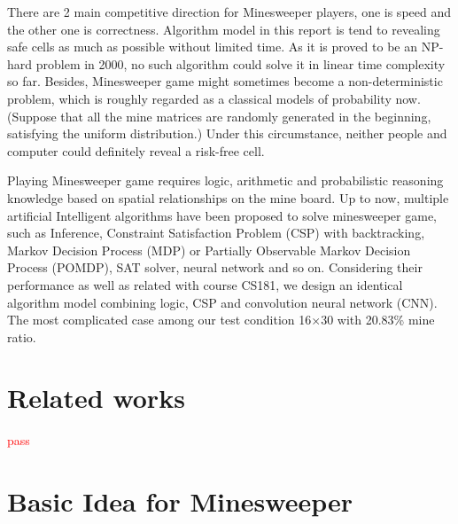 \documentclass[10pt,twocolumn,letterpaper]{article}
\begin{document}
There are 2 main competitive direction for Minesweeper players, one is speed and the other one is correctness. Algorithm model in this report is tend to revealing safe cells as much as possible without limited time. As it is proved to be an NP-hard problem in 2000, no such algorithm could solve it in linear time complexity so far. Besides, Minesweeper game might sometimes become a non-deterministic problem, which is roughly regarded as a classical models of probability now.(Suppose that all the mine matrices are randomly  generated in the beginning, satisfying the uniform distribution.) Under this circumstance, neither people and computer could definitely reveal a risk-free cell. 

Playing Minesweeper game requires logic, arithmetic and probabilistic reasoning knowledge based on spatial relationships on the mine board. Up to now, multiple artificial Intelligent algorithms have been proposed to solve minesweeper game, such as Inference, Constraint Satisfaction Problem (CSP) with backtracking, Markov Decision Process (MDP) or Partially Observable Markov Decision Process (POMDP), SAT solver, neural network and so on. Considering their performance as well as related with course CS181, we design an identical algorithm model combining logic, CSP and convolution neural network (CNN). The most complicated case among our test condition 16$\times$30 with 20.83\% mine ratio. 


\section{Related works}
\textcolor{red}{pass}


\section{Basic Idea for Minesweeper}
\end{document}
